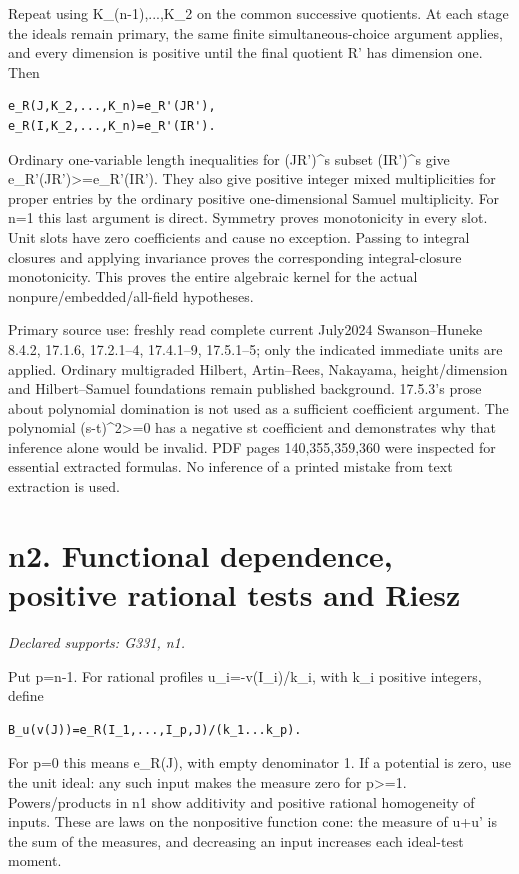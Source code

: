 \documentclass[11pt]{article}
\begin{document}
Repeat using K\_(n-1),...,K\_2 on the common successive quotients. At each stage the ideals remain primary, the same finite simultaneous-choice argument applies, and every dimension is positive until the final quotient R' has dimension one. Then

\begin{Verbatim}[fontsize=\small,breaklines=true,breakanywhere=true]
e_R(J,K_2,...,K_n)=e_R'(JR'),
e_R(I,K_2,...,K_n)=e_R'(IR').
\end{Verbatim}

Ordinary one-variable length inequalities for (JR')\textasciicircum{}s subset (IR')\textasciicircum{}s give e\_R'(JR')>=e\_R'(IR'). They also give positive integer mixed multiplicities for proper entries by the ordinary positive one-dimensional Samuel multiplicity. For n=1 this last argument is direct. Symmetry proves monotonicity in every slot. Unit slots have zero coefficients and cause no exception. Passing to integral closures and applying invariance proves the corresponding integral-closure monotonicity. This proves the entire algebraic kernel for the actual nonpure/embedded/all-field hypotheses.

Primary source use: freshly read complete current July2024 Swanson--Huneke 8.4.2, 17.1.6, 17.2.1--4, 17.4.1--9, 17.5.1--5; only the indicated immediate units are applied. Ordinary multigraded Hilbert, Artin--Rees, Nakayama, height/dimension and Hilbert--Samuel foundations remain published background. 17.5.3's prose about polynomial domination is not used as a sufficient coefficient argument. The polynomial (s-t)\textasciicircum{}2>=0 has a negative st coefficient and demonstrates why that inference alone would be invalid. PDF pages 140,355,359,360 were inspected for essential extracted formulas. No inference of a printed mistake from text extraction is used.

\section{n2. Functional dependence, positive rational tests and Riesz}
\textit{Declared supports: G331, n1.}

Put p=n-1. For rational profiles u\_i=-v(I\_i)/k\_i, with k\_i positive integers, define

\begin{Verbatim}[fontsize=\small,breaklines=true,breakanywhere=true]
B_u(v(J))=e_R(I_1,...,I_p,J)/(k_1...k_p).
\end{Verbatim}

For p=0 this means e\_R(J), with empty denominator 1. If a potential is zero, use the unit ideal: any such input makes the measure zero for p>=1. Powers/products in n1 show additivity and positive rational homogeneity of inputs. These are laws on the nonpositive function cone: the measure of u+u' is the sum of the measures, and decreasing an input increases each ideal-test moment.
\end{document}
